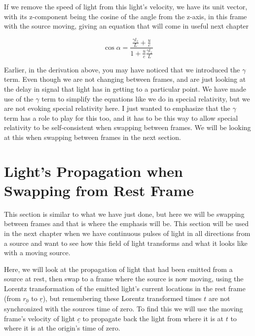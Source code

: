If we remove the speed of light from this light's velocity, we have its unit vector, with its z-component being the cosine of the angle from the z-axis, in this frame with the source moving, giving an equation that will come in useful next chapter

\begin{equation}
	\label{eq: cos alpha prime in terms of l}
	\cos{\alpha} = \frac{ \frac{\gamma l_{z}}{L} + \frac{u}{c}}{ 1 + \frac{u}{c} \frac{\gamma l_{z}}{L}}
\end{equation}

Earlier, in the derivation above, you may have noticed that we introduced the $\gamma$ term.
Even though we are not changing between frames, and are just looking at the delay in signal that light has in getting to a particular point.
We have made use of the $\gamma$ term to simplify the equations like we do in special relativity, but we are not evoking special relativity here.
I just wanted to emphasize that the $\gamma$ term has a role to play for this too, and it has to be this way to allow special relativity to be self-consistent when swapping between frames.
We will be looking at this when swapping between frames in the next section.


\section{Light's Propagation when Swapping from Rest Frame}\label{subsect: Emitted Light When Swapping Frame}

This section is similar to what we have just done, but here we will be swapping between frames and that is where the emphasis will be.
This section will be used in the next chapter when we have continuous pulses of light in all directions from a source and want to see how this field of light transforms and what it looks like with a moving source.

Here, we will look at the propagation of light that had been emitted from a source at rest, then swap to a frame where the source is now moving, using the Lorentz transformation of the emitted light's current locations in the rest frame (from $\underline{r_0}$ to $\underline{r}$), but remembering these Lorentz transformed times $t$ are not synchronized with the sources time of zero.
To find this we will use the moving frame's velocity of light $\underline{c}$ to propagate back the light from where it is at $t$ to where it is at the origin's time of zero.


